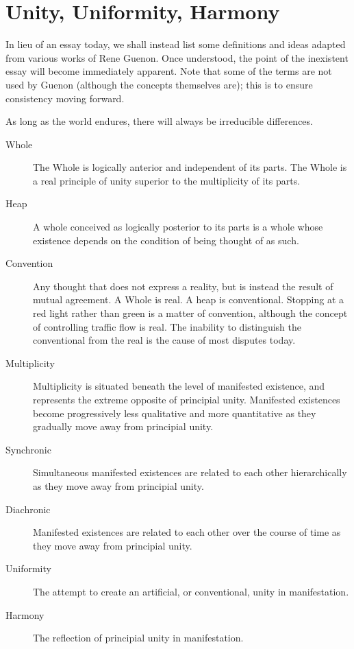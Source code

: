 \section{Unity, Uniformity, Harmony}

In lieu of an essay today, we shall instead list some definitions and ideas adapted from various works of Rene Guenon. Once understood, the point of the inexistent essay will become immediately apparent. Note that some of the terms are not used by Guenon (although the concepts themselves are); this is to ensure consistency moving forward.

\begin{quotex}
As long as the world endures, there will always be irreducible differences. 

\end{quotex}
\begin{description}
\item[Whole ]

The Whole is logically anterior and independent of its parts. The Whole is a real principle of unity superior to the multiplicity of its parts. 

\item[Heap ]

A whole conceived as logically posterior to its parts is a whole whose existence depends on the condition of being thought of as such. 

\item[Convention ]

Any thought that does not express a reality, but is instead the result of mutual agreement. A Whole is real. A heap is conventional. Stopping at a red light rather than green is a matter of convention, although the concept of controlling traffic flow is real. The inability to distinguish the conventional from the real is the cause of most disputes today. 

\item[Multiplicity ]

Multiplicity is situated beneath the level of manifested existence, and represents the extreme opposite of principial unity. Manifested existences become progressively less qualitative and more quantitative as they gradually move away from principial unity. 

\item[Synchronic ]

Simultaneous manifested existences are related to each other hierarchically as they move away from principial unity. 

\item[Diachronic ]

Manifested existences are related to each other over the course of time as they move away from principial unity. 

\item[Uniformity ]

The attempt to create an artificial, or conventional, unity in manifestation. 

\item[Harmony ]

The reflection of principial unity in manifestation. 

\end{description}
